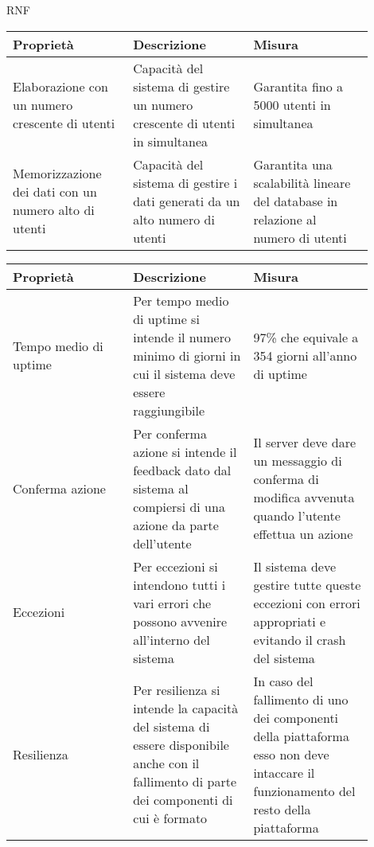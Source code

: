 \begin{listaPersonale}{RNF}
    \begin{tabular}{|p{0.3\linewidth}|p{0.3\linewidth}|p{0.3\linewidth}|}
        \hline
        \rowcolor{viola} \textbf{Proprietà}                                         &
        \textbf{Descrizione}                                                        &
        \textbf{Misura}                                                               \\
        \hline
        Elaborazione con un numero crescente di utenti                              &
        Capacità del sistema di gestire un numero crescente di utenti in simultanea &
        Garantita fino a 5000 utenti in simultanea                                    \\
        \hline
        Memorizzazione dei dati con un numero alto di utenti                        &
        Capacità del sistema di gestire i dati generati da un alto numero di utenti &
        Garantita una scalabilità lineare del database
        in relazione al numero di utenti                                              \\
        \hline
    \end{tabular}

    \newpage
    \begin{tabular}{|p{0.3\linewidth}|p{0.3\linewidth}|p{0.3\linewidth}|}
        \hline
        \rowcolor{viola} \textbf{Proprietà}      &
        \textbf{Descrizione}                     &
        \textbf{Misura}                                      \\
        \hline
        Tempo medio di uptime                    &
        Per tempo medio di uptime si intende il
        numero minimo di giorni in cui il sistema
        deve essere raggiungibile                &
        97\% che equivale a 354 giorni all'anno di uptime    \\
        \hline
        Conferma azione                          &
        Per conferma  azione si intende il feedback
        dato dal sistema al compiersi di una azione
        da parte dell'utente                     &
        Il server deve dare un messaggio di conferma di
        modifica avvenuta quando l'utente effettua un azione \\
        \hline
        Eccezioni                                &
        Per eccezioni si intendono tutti i vari errori che
        possono avvenire all'interno del sistema &
        Il sistema deve gestire tutte queste eccezioni con
        errori appropriati e evitando il crash del sistema   \\
        \hline
        Resilienza                               &
        Per resilienza si intende la capacità del sistema di
        essere disponibile anche con il fallimento di
        parte dei componenti di cui è formato    &
        In caso del fallimento di uno dei componenti della
        piattaforma esso non deve intaccare il funzionamento
        del resto della piattaforma                          \\
        \hline
    \end{tabular}


\end{listaPersonale}
